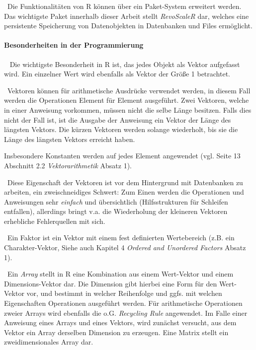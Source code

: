 ~\newline Die Funktionalitäten von R können über ein Paket-System erweitert werden. Das wichtigste Paket innerhalb dieser Arbeit stellt \textit{RevoScaleR} dar, welches eine persistente Speicherung von Datenobjekten in Datenbanken und Files ermöglicht. 

\paragraph{Besonderheiten in der Programmierung}~\newline
Die wichtigste Besonderheit in R ist, das jedes Objekt als Vektor aufgefasst wird. Ein einzelner Wert wird ebenfalls als Vektor der Größe 1 betrachtet.

~\newline Vektoren können für arithmetische Ausdrücke verwendet werden, in diesem Fall werden die Operationen Element für Element ausgeführt. Zwei Vektoren, welche in einer Anweisung vorkommen, müssen nicht die selbe Länge besitzen. Falls dies nicht der Fall ist, ist die Ausgabe der Anweisung ein Vektor der Länge des längsten Vektors. Die kürzen Vektoren werden solange wiederholt, bis sie die Länge des längsten Vektors erreicht haben.

Insbesondere Konstanten werden auf jedes Element angewendet (vgl. \cite{RIntro} Seite 13 Abschnitt 2.2 \textit{Vektorarithmetik} Absatz 1).

~\newline Diese Eigenschaft der Vektoren ist vor dem Hintergrund mit Datenbanken zu arbeiten, ein zweischneidiges Schwert: Zum Einen werden die Operationen und Anweisungen sehr \textit{einfach} und übersichtlich (Hilfsstrukturen für Schleifen entfallen), allerdings bringt v.a. die Wiederholung der kleineren Vektoren erhebliche Fehlerquellen mit sich. 

~\newline Ein Faktor ist ein Vektor mit einem fest definierten Wertebereich (z.B. ein Charakter-Vektor, Siehe auch \cite{RIntro} Kapitel 4 \textit{Ordered and Unordered Factors} Absatz 1).

~\newline Ein \textit{Array} stellt in R eine Kombination aus einem Wert-Vektor und einem Dimensions-Vektor dar. Die Dimension gibt hierbei eine Form für den Wert-Vektor vor, und bestimmt in welcher Reihenfolge und ggfs. mit welchen Eigenschaften Operationen ausgeführt werden. Für arithmetische Operationen zweier Arrays wird ebenfalls die o.G. \textit{Recycling Rule} angewendet. Im Falle einer Anweisung eines Arrays und eines Vektors, wird zunächst versucht, aus dem Vektor ein Array derselben Dimension zu erzeugen. Eine Matrix stellt ein zweidimensionales Array dar. 


